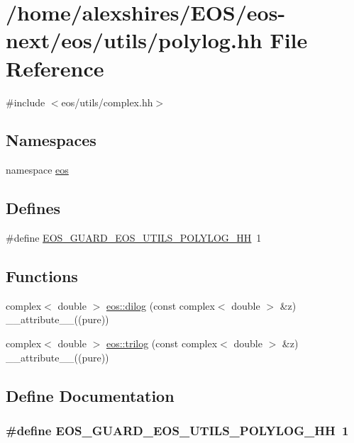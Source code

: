 \hypertarget{polylog_8hh}{
\section{/home/alexshires/EOS/eos-\/next/eos/utils/polylog.hh File Reference}
\label{polylog_8hh}
}
{\ttfamily \#include $<$eos/utils/complex.hh$>$}\par
\subsection*{Namespaces}
\begin{DoxyCompactItemize}
\item 
namespace \hyperlink{namespaceeos}{eos}
\end{DoxyCompactItemize}
\subsection*{Defines}
\begin{DoxyCompactItemize}
\item 
\#define \hyperlink{polylog_8hh_a26b565278b6b73270f9c0215b0e40640}{EOS\_\-GUARD\_\-EOS\_\-UTILS\_\-POLYLOG\_\-HH}~1
\end{DoxyCompactItemize}
\subsection*{Functions}
\begin{DoxyCompactItemize}
\item 
complex$<$ double $>$ \hyperlink{namespaceeos_a7fb80dc36d6e29adfbde318a197ea591}{eos::dilog} (const complex$<$ double $>$ \&z) \_\-\_\-attribute\_\-\_\-((pure))
\item 
complex$<$ double $>$ \hyperlink{namespaceeos_a38a0279ef72ff9c1bdb17dd7956a199a}{eos::trilog} (const complex$<$ double $>$ \&z) \_\-\_\-attribute\_\-\_\-((pure))
\end{DoxyCompactItemize}


\subsection{Define Documentation}
\hypertarget{polylog_8hh_a26b565278b6b73270f9c0215b0e40640}{
\subsubsection[{EOS\_\-GUARD\_\-EOS\_\-UTILS\_\-POLYLOG\_\-HH}]{\setlength{\rightskip}{0pt plus 5cm}\#define EOS\_\-GUARD\_\-EOS\_\-UTILS\_\-POLYLOG\_\-HH~1}}
\label{polylog_8hh_a26b565278b6b73270f9c0215b0e40640}

